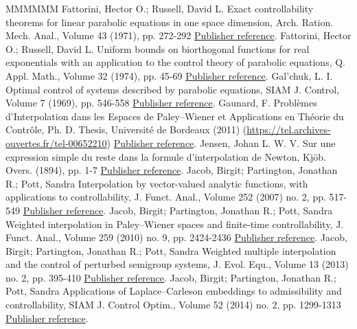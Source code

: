 \begin{thebibliography}{MMMMMM}
 Fattorini, Hector O.; Russell, David L. Exact controllability theorems for linear parabolic equations in one space dimension, Arch. Ration. Mech. Anal., Volume 43 (1971), pp. 272-292 \href{https://ahl.centre-mersenne.org/item/AHL_2020__3__717_0/#FattoriniRussell71}{Publisher reference}.
 Fattorini, Hector O.; Russell, David L. Uniform bounds on biorthogonal functions for real exponentials with an application to the control theory of parabolic equations, Q. Appl. Math., Volume 32 (1974), pp. 45-69 \href{https://ahl.centre-mersenne.org/item/AHL_2020__3__717_0/#FattoriniRussell74}{Publisher reference}.
 Gal’chuk, L. I. Optimal control of systems described by parabolic equations, SIAM J. Control, Volume 7 (1969), pp. 546-558 \href{https://ahl.centre-mersenne.org/item/AHL_2020__3__717_0/#Galchuk69}{Publisher reference}.
 Gaunard, F. Problèmes d’Interpolation dans les Espaces de Paley–Wiener et Applications en Théorie du Contrôle, Ph. D. Thesis, Université de Bordeaux (2011) (\url{https://tel.archives-ouvertes.fr/tel-00652210}) \href{https://ahl.centre-mersenne.org/item/AHL_2020__3__717_0/#TheseGaunard}{Publisher reference}.
 Jensen, Johan L. W. V. Sur une expression simple du reste dans la formule d’interpolation de Newton, Kjöb. Overs. (1894), pp. 1-7 \href{https://ahl.centre-mersenne.org/item/AHL_2020__3__717_0/#Jensen_1894}{Publisher reference}.
 Jacob, Birgit; Partington, Jonathan R.; Pott, Sandra Interpolation by vector-valued analytic functions, with applications to controllability, J. Funct. Anal., Volume 252 (2007) no. 2, pp. 517-549 \href{https://ahl.centre-mersenne.org/item/AHL_2020__3__717_0/#JacobPartingtonPott2007}{Publisher reference}.
 Jacob, Birgit; Partington, Jonathan R.; Pott, Sandra Weighted interpolation in Paley–Wiener spaces and finite-time controllability, J. Funct. Anal., Volume 259 (2010) no. 9, pp. 2424-2436 \href{https://ahl.centre-mersenne.org/item/AHL_2020__3__717_0/#JacobPartingtonPott2010}{Publisher reference}.
 Jacob, Birgit; Partington, Jonathan R.; Pott, Sandra Weighted multiple interpolation and the control of perturbed semigroup systems, J. Evol. Equ., Volume 13 (2013) no. 2, pp. 395-410 \href{https://ahl.centre-mersenne.org/item/AHL_2020__3__717_0/#JacobPartingtonPott2013}{Publisher reference}.
 Jacob, Birgit; Partington, Jonathan R.; Pott, Sandra Applications of Laplace–Carleson embeddings to admissibility and controllability, SIAM J. Control Optim., Volume 52 (2014) no. 2, pp. 1299-1313 \href{https://ahl.centre-mersenne.org/item/AHL_2020__3__717_0/#JacobPartingtonPott2014}{Publisher reference}.

\end{thebibliography}
